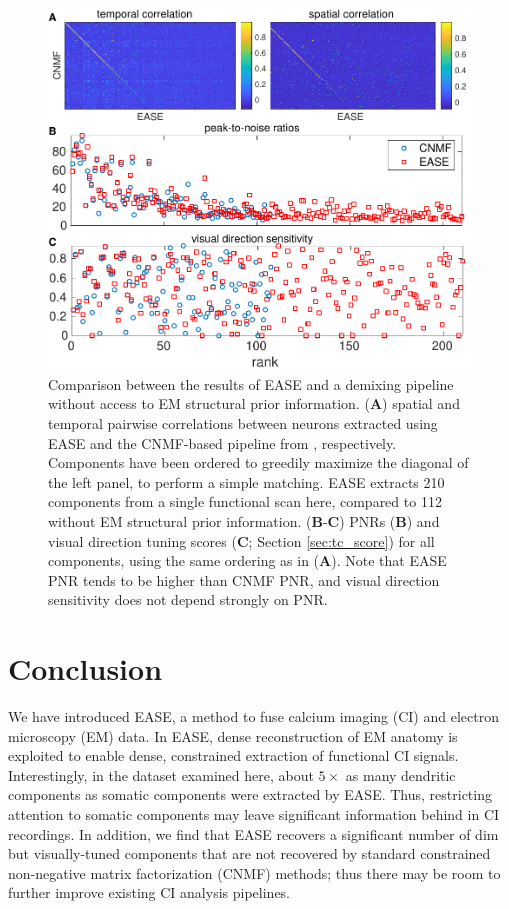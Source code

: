 \documentclass[10pt,letterpaper]{article}
\begin{document}
{\begin{figure}[!t]
\includegraphics[width=1\textwidth]{Figs/cnmf_ease_match.pdf}
\caption{Comparison between the results of EASE and a demixing pipeline without access to EM structural prior information. (\textbf{A}) spatial and temporal pairwise correlations between neurons extracted using EASE and the CNMF-based pipeline from \citep{Buchanan2018}, respectively.  Components have been ordered to greedily maximize the diagonal of the left panel, to perform a simple matching.  EASE extracts  210 components from a single functional scan here, compared to 112 without EM structural prior information.  (\textbf{B}-\textbf{C}) PNRs (\textbf{B}) and visual direction tuning scores (\textbf{C}; Section \ref{sec:tc_score}) for all components, using the same ordering as in (\textbf{A}).  Note that EASE PNR tends to be higher than CNMF PNR, and visual direction sensitivity does not depend strongly on PNR.}
\label{fig:compare}
\end{figure}

\clearpage

\section{Conclusion}

We have introduced EASE, a method to fuse calcium imaging (CI) and electron microscopy (EM) data.  In EASE,
dense reconstruction of EM anatomy is exploited to enable dense, constrained extraction of functional CI signals.  Interestingly, in the dataset examined here, about $5 \times$ as many dendritic components as somatic components were extracted by EASE.  Thus, restricting attention to somatic components may leave significant information behind in CI recordings.  In addition, we find that EASE recovers a significant number of dim but visually-tuned components that are not recovered by standard constrained non-negative matrix factorization (CNMF) methods; thus there may be room to further improve existing CI analysis pipelines.

}
\end{document}

